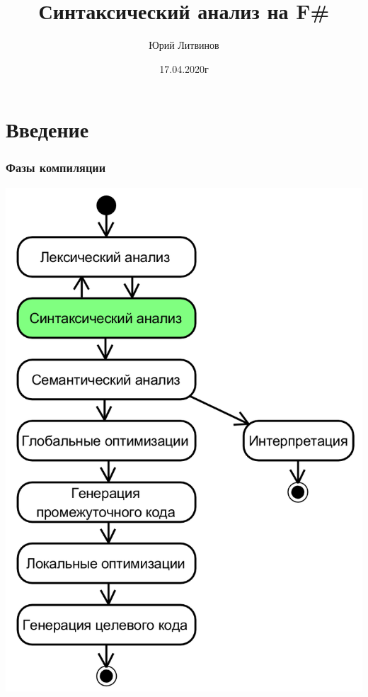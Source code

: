 \documentclass[xetex,mathserif,serif]{beamer}
\title{Синтаксический анализ на F\#}
\author{Юрий Литвинов}
\date{17.04.2020г}
\begin{document}
    
    \frame{\titlepage}

    \section{Введение}

    \begin{frame}
        \frametitle{Фазы компиляции}
        \begin{center}
            \includegraphics[height=0.8\textheight]{compilerPhases.png}
        \end{center}
    \end{frame}
\end{document}
